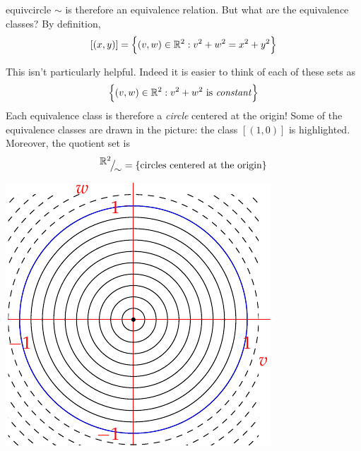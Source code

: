 \begin{example}{}{equivcircle}
	$\sim$ is therefore an equivalence relation. But what are the equivalence classes? By definition,
	\[
		[(x,y)]=\Bigl\{(v,w)\in\mathbb{R}^2:v^2+w^2=x^2+y^2\Bigr\}
	\]
	\begin{minipage}[t]{0.6\linewidth}\vspace{0pt}
		This isn't particularly helpful. Indeed it is easier to think of each of these sets as
		\[
			\Bigl\{(v,w)\in\mathbb{R}^2:v^2+w^2\text{ is \emph{constant}}\Bigr\}
		\]
		Each equivalence class is therefore a \emph{circle} centered at the origin! Some of the equivalence classes are drawn in the picture: the class $[(1,0)]$ is highlighted. Moreover, the quotient set is
		\[
			{}^{\textstyle {\mathbb{R}^2}}\!\big/_{\textstyle \!{\sim}}=\{\text{circles centered at the origin}\}
		\]
	\end{minipage}
	\hfill
	\begin{minipage}[t]{0.35\linewidth}\vspace{0pt}
		\includegraphics[width=\textwidth]{relations-24-circles}
	\end{minipage}
\end{example}

